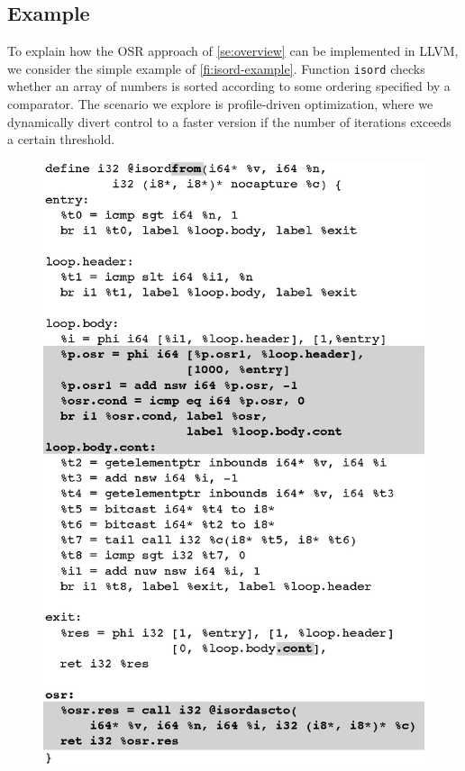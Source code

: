 \subsection{Example}
To explain how the OSR approach of \mysection\ref{se:overview} can be implemented in LLVM, we consider the simple example of \myfigure\ref{fi:isord-example}. Function {\tt isord} checks whether an array of numbers is sorted according to some ordering specified by a comparator. The scenario we explore is profile-driven optimization, where we dynamically divert control to a faster version if the number of iterations exceeds a certain threshold. 

\ifdefined\noauthorea
\begin{figure}[t]
\begin{center}
\includegraphics[width=0.9\columnwidth]{figures/isordfrom/isordfrom.eps}
\caption{\protect}
\end{center}
\end{figure}
\fi

